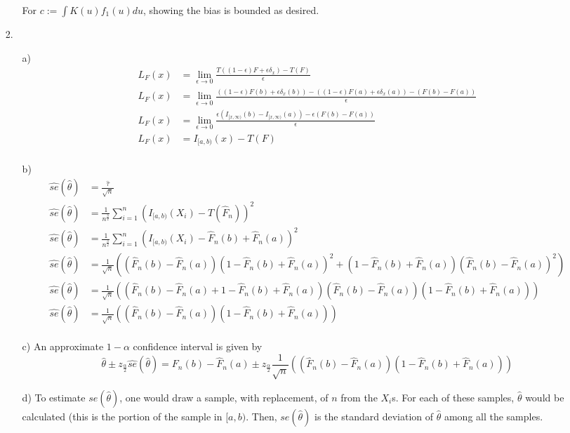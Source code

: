 \documentclass[11pt]{article}
\theoremstyle{definition}
\begin{document}
\begin{itemize}
\begin{itemize}
                For \(c:=\int K(u) f_1(u) du\), showing the bias is bounded as desired.
        \end{itemize}
    \item[2.]
        \begin{itemize}
            \item[a)]
                \begin{align*}
                    L_F(x)&=\lim_{\epsilon\to 0} \frac{T((1-\epsilon)F+\epsilon\delta_x)-T(F)}{\epsilon} \\
                    L_F(x)&=\lim_{\epsilon\to 0} \frac{((1-\epsilon)F(b)+\epsilon\delta_x(b))-((1-\epsilon)F(a)+\epsilon\delta_x(a))-(F(b)-F(a))}{\epsilon} \\
                    L_F(x)&=\lim_{\epsilon\to 0} \frac{\epsilon(I_{[x,\infty)}(b)-I_{[x,\infty)}(a))-\epsilon (F(b)-F(a))}{\epsilon} \\
                    L_F(x)&= I_{[a,b)}(x)-T(F) \\
                \end{align*}
            \item[b)]
                \begin{align*}
                    \hat{se}(\hat \theta) &= \frac{\hat \tau}{\sqrt{n}} \\
                    \hat{se}(\hat \theta) &= \frac{1}{n^\frac{3}{2}}\sum_{i=1}^n(I_{[a,b)}(X_i)-T(\hat F_n))^2 \\
                    \hat{se}(\hat \theta) &= \frac{1}{n^\frac{3}{2}}\sum_{i=1}^n(I_{[a,b)}(X_i)-\hat F_n(b)+\hat F_n(a))^2 \\
                    \hat{se}(\hat \theta) &= \frac{1}{\sqrt{n}}\left((\hat F_n(b)-\hat F_n(a))(1-\hat F_n(b)+\hat F_n(a))^2+(1-\hat F_n(b)+\hat F_n(a))(\hat F_n(b)-\hat F_n(a))^2\right) \\
                    \hat{se}(\hat \theta) &= \frac{1}{\sqrt{n}}\left((\hat F_n(b)-\hat F_n(a)+1- \hat F_n(b)+\hat F_n(a))(\hat F_n(b)-\hat F_n(a))(1-\hat F_n(b)+\hat F_n(a))\right) \\
                    \hat{se}(\hat \theta) &= \frac{1}{\sqrt{n}}\left((\hat F_n(b)-\hat F_n(a))(1-\hat F_n(b)+\hat F_n(a))\right) \\
                \end{align*}
            \item[c)]
                An approximate \(1-\alpha\) confidence interval is given by 
                \[\hat \theta \pm z_{\frac{\alpha}{2}}\hat{se}(\hat \theta) = F_n(b)-\hat F_n(a) \pm z_{\frac{\alpha}{2}}\frac{1}{\sqrt{n}}\left((\hat F_n(b)-\hat F_n(a))(1-\hat F_n(b)+\hat F_n(a))\right)\]
            \item[d)]
                To estimate \(se(\hat \theta)\), one would draw a sample, with replacement, of $n$ from the $X_i$s. For each of these samples, $\hat\theta$ would be calculated (this is the portion of the sample in \([a,b)\). Then, \(se(\hat \theta)\) is the standard deviation of $\hat\theta$ among all the samples.


\end{itemize}
\end{itemize}
\end{document}
